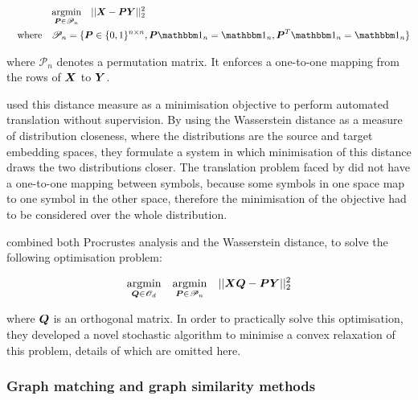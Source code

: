 \begin{equation}
\begin{split}
    &\argmin{\vecP \in \mathscr{P}_n} \quad || \vecX - \vecP \vecY ||_2^2 \\
    \spaced{where}&\mathscr{P}_n = \{\vecP \in \{0, 1\}^{n \times n}, \vecP \one_n = \one_n, \vecP^T \one_n = \one_n \}
\end{split}
\end{equation}

where $\mathscr{P}_n$ denotes a permutation matrix. It enforces a one-to-one mapping from the rows of $\boldsymbol{X}$ to $\boldsymbol{Y}$.


\cite{Zhang2017EarthMD} used this distance measure as a minimisation objective to perform automated translation without supervision. By using the Wasserstein distance as a measure of distribution closeness, where the distributions are the source and target embedding spaces, they formulate a system in which minimisation of this distance draws the two distributions closer. The translation problem faced by \cite{Zhang2017EarthMD} did not have a one-to-one mapping between symbols, because some symbols in one space map to one symbol in the other space, therefore the minimisation of the objective had to be considered over the whole distribution. 

\cite{UnsupervisedAlignmentWP} combined both Procrustes analysis and the Wasserstein distance, to solve the following optimisation problem:

\begin{equation}
\begin{split}
\underset{\boldsymbol{Q} \in \mathscr{O}_d}{\operatorname{argmin}} \quad \underset{\boldsymbol{P} \in \mathscr{P}_n }{\operatorname{argmin}}\quad || \boldsymbol{X} \boldsymbol{Q} - \boldsymbol{P} \boldsymbol{Y}||_2^2
\end{split}
\end{equation}

where $\boldsymbol{Q}$ is an orthogonal matrix. In order to practically solve this optimisation, they developed a novel stochastic algorithm to minimise a convex relaxation of this problem, details of which are omitted here. 

\subsubsection{Graph matching and graph similarity methods}

